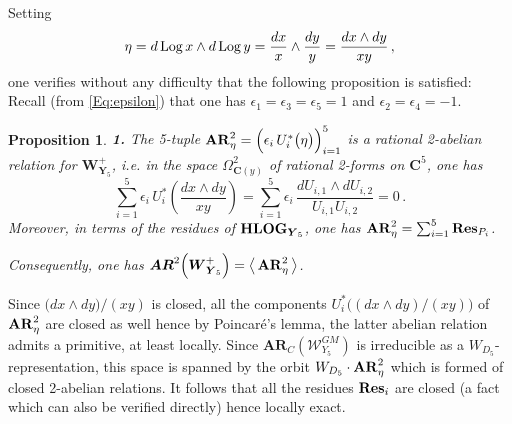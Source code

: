 \documentclass[11pt]{amsart}
\newtheorem{prop}[thm]{Proposition}
\begin{document}
Setting
\begin{equation}
\label{Eq:eta}
\eta=
d\,{\rm Log}\,x \wedge d\, {\rm Log}\,y
= \frac{dx}{x}
\wedge 
\frac{dy}{y}=
\frac{dx\wedge dy}{xy}
\,, 
\end{equation}
one verifies without any difficulty that the following proposition is satisfied: 
Recall (from \eqref{Eq:epsilon}) that one has $\epsilon_1=\epsilon_3=\epsilon_5=1$ and 
 $\epsilon_2=\epsilon_4=-1$. 
\begin{prop}
\label{Prop:AR-2-eta}
{\bf 1.} The 5-tuple ${\bf AR}^2_\eta=\Big( \epsilon_i\,U_i^*\big( \eta\big)\Big)_{i=1}^5$ is a rational 2-abelian relation  for $\boldsymbol{W}^{+}_{ \boldsymbol{Y}_5}$, i.e. in the space $\Omega^2_{\mathbf C(y)}$ of rational 2-forms on $\mathbf C^5$, one has 
 $$
\sum_{i=1}^5   \epsilon_i\,U_i^*\left( \frac{dx\wedge dy}{xy}\right)=
\sum_{i=1}^5   \epsilon_i\, \frac{dU_{i,1}\wedge dU_{i,2}}{
U_{i,1}U_{i,2}
}
=
0\, . 
$$
%
Moreover, in terms of the residues of ${\bf HLOG}_{\boldsymbol{Y}_5}$, one has 
$
{\bf AR}^2_\eta
=\sum_{i=1}^5 
{\bf Res}_{P_{i}}
$.

Consequently, one has $\boldsymbol{AR}^2\Big( \boldsymbol{W}^{+}_{ \hspace{-0.0cm}\boldsymbol{Y}_5}\Big)=
\big\langle \, {\bf AR}^2_\eta
\, \big\rangle
$. 
\end{prop}
Since $\big( dx\wedge dy\big)/(xy)$ is closed, all the components $U_i^*\big( (dx\wedge dy)/(xy)\big)$ of 
$ {\bf AR}^2_\eta$ are closed as well  hence by Poincar\'e's lemma, the latter abelian relation admits a primitive, at least locally.  Since $\boldsymbol{AR}_C( \boldsymbol{\mathcal W}^{GM}_{ {Y}_5})$ is irreducible as a $W_{D_5}$-representation, this space is spanned by the orbit $W_{D_5}\cdot  {\bf AR}^2_\eta$ which is formed of closed  2-abelian relations. It follows that all the residues ${\bf Res}_i$ are closed (a fact which can also be verified directly) hence locally exact. 
\end{document}
